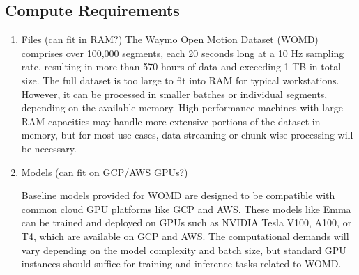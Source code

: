 \documentclass{article} %
\begin{document}
	\subsection{Compute Requirements}
	\begin{enumerate}
		\item Files (can fit in RAM?)
		The Waymo Open Motion Dataset (WOMD) comprises over 100,000 segments, each 20 seconds long at a 10 Hz sampling rate, resulting in more than 570 hours of data and exceeding 1 TB in total size. The full dataset is too large to fit into RAM for typical workstations. However, it can be processed in smaller batches or individual segments, depending on the available memory. High-performance machines with large RAM capacities may handle more extensive portions of the dataset in memory, but for most use cases, data streaming or chunk-wise processing will be necessary.
		\item Models (can fit on GCP/AWS GPUs?)
		
		Baseline models provided for WOMD are designed to be compatible with common cloud GPU platforms like GCP and AWS. These models like Emma\cite{Hwang2024EMMAEM} can be trained and deployed on GPUs such as NVIDIA Tesla V100, A100, or T4, which are available on GCP and AWS. The computational demands will vary depending on the model complexity and batch size, but standard GPU instances should suffice for training and inference tasks related to WOMD.
	\end{enumerate}
\end{document}
